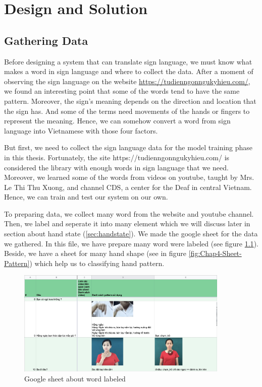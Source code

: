 \chapter{Design and Solution}
\section{Gathering Data}



Before designing a system that can translate sign language, we must know what makes a word in sign language and where to collect the data. After a moment of observing the sign language on the website \url{https://tudienngonngukyhieu.com/}, we found an interesting point that some of the words tend to have the same pattern. Moreover, the sign's meaning depends on the direction and location that the sign has. And some of the terms need movements of the hands or fingers to represent the meaning. Hence, we can somehow convert a word from sign language into Vietnamese with those four factors.

But first, we need to collect the sign language data for the model training phase in this thesis. Fortunately, the site https://tudienngonngukyhieu.com/ is considered the library with enough words in sign language that we need. Moreover, we learned some of the words from videos on youtube, taught by Mrs. Le Thi Thu Xuong, and channel CDS, a center for the Deaf in central Vietnam. Hence, we can train and test our system on our own.

To preparing data, we collect many word from the website and youtube channel. Then, we label and seperate it into many element which we will discuss later in section about hand state (\ref{sec:handstate}). We made the google sheet for the data we gathered. In this file, we have prepare many word were labeled (see figure \ref{fig:Chap4-Label-Word}). Beside, we have a sheet for many hand shape (see in figure \ref{fig:Chap4-Sheet-Pattern}) which help us to classifying hand pattern.


\begin{figure}[H]
	\centering
	\includegraphics[width=0.9\textwidth]{img/Chap4/Label-Word.jpg}
	\caption{Google sheet about word labeled}
	\label{fig:Chap4-Label-Word}
\end{figure}

